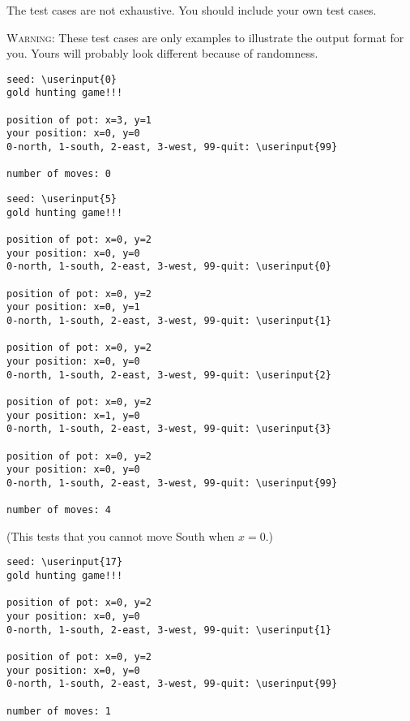 The test cases are not exhaustive. You should include your own test cases.

\textsc{Warning:} These test cases are only examples to illustrate the output
format for you. Yours will probably look different because of randomness.

\resett
\nextt
\begin{Verbatim}[frame=single, commandchars=\\\{\}]
seed: \userinput{0}
gold hunting game!!!

position of pot: x=3, y=1
your position: x=0, y=0
0-north, 1-south, 2-east, 3-west, 99-quit: \userinput{99}

number of moves: 0
\end{Verbatim}

\nextt
\begin{Verbatim}[frame=single, commandchars=\\\{\}]
seed: \userinput{5}
gold hunting game!!!

position of pot: x=0, y=2
your position: x=0, y=0
0-north, 1-south, 2-east, 3-west, 99-quit: \userinput{0}

position of pot: x=0, y=2
your position: x=0, y=1
0-north, 1-south, 2-east, 3-west, 99-quit: \userinput{1}

position of pot: x=0, y=2
your position: x=0, y=0
0-north, 1-south, 2-east, 3-west, 99-quit: \userinput{2}

position of pot: x=0, y=2
your position: x=1, y=0
0-north, 1-south, 2-east, 3-west, 99-quit: \userinput{3}

position of pot: x=0, y=2
your position: x=0, y=0
0-north, 1-south, 2-east, 3-west, 99-quit: \userinput{99}

number of moves: 4
\end{Verbatim}

\nextt
(This tests that you cannot move South when $x=0$.)
\begin{Verbatim}[frame=single, commandchars=\\\{\}]
seed: \userinput{17}
gold hunting game!!!

position of pot: x=0, y=2
your position: x=0, y=0
0-north, 1-south, 2-east, 3-west, 99-quit: \userinput{1}

position of pot: x=0, y=2
your position: x=0, y=0
0-north, 1-south, 2-east, 3-west, 99-quit: \userinput{99}

number of moves: 1
\end{Verbatim}

